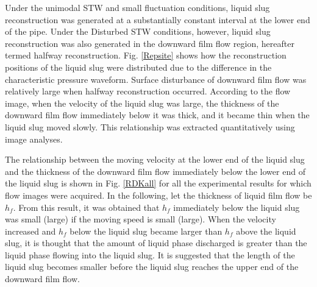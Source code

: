 \documentclass[aps,pre,preprint,groupedaddress,showkeys]{revtex4-2}
\begin{document}
Under the unimodal STW and small fluctuation conditions, liquid slug reconstruction was generated at a substantially constant interval at the lower end of the pipe. 
Under the Disturbed STW conditions, however, liquid slug reconstruction was also generated in the downward film flow region, hereafter termed halfway reconstruction.
Fig. \ref{Repsite} shows how the reconstruction positions of the liquid slug were distributed due to the difference in the characteristic pressure waveform.
Surface disturbance of downward film flow was relatively large when halfway reconstruction occurred.
According to the flow image, when the velocity of the liquid slug was large, the thickness of the downward film flow immediately below it was thick, and it became thin when the liquid slug moved slowly.
This relationship was extracted quantitatively using image analyses.

The relationship between the moving velocity at the lower end of the liquid slug and the thickness of the downward film flow immediately below the lower end of the liquid slug is shown in Fig. \ref{RDKall} for all the experimental results for which flow images were acquired.
In the following, let the thickness of liquid film flow be $h_f$.
From this result, it was obtained that $h_f$ immediately below the liquid slug was small (large) if the moving speed is small (large).
When the velocity increased and $h_f$ below the liquid slug became larger than $h_f$ above the liquid slug, it is thought that the amount of liquid phase discharged is greater than the liquid phase flowing into the liquid slug.
It is suggested that the length of the liquid slug becomes smaller before the liquid slug reaches the upper end of the downward film flow.
\end{document}
